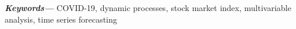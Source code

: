 \documentclass[sigconf]{acmart}
\providecommand{\keywords}[1]
{
  \small	
  \textbf{\textit{Keywords---}} #1
}
\begin{document}
\keywords{COVID-19, dynamic processes, stock market index, multivariable analysis, time series forecasting}

\maketitle








\printbibliography
% 
% 





% 
 
\end{document}
